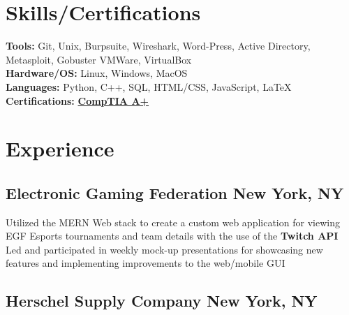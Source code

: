 \documentclass[a4paper]{Resume}
\begin{document}
\begin{onehalfspace}
\sectionsep

\section{Skills/Certifications} 
\hrulefill


\pt \textbf{Tools:} Git, Unix, Burpsuite, Wireshark, Word-Press, Active Directory, Metasploit, Gobuster VMWare, VirtualBox \\

\pt \textbf{Hardware/OS:}  Linux, Windows, MacOS  \\

\pt \textbf{Languages:}  Python, C++, SQL, HTML/CSS, JavaScript, \LaTeX \\

\pt \textbf{Certifications:} \href{https://www.udemy.com/certificate/UC-98f894dc-4e81-4be3-aeb9-21b391568400/}{\textbf{CompTIA A+}} \\
\sectionsep


\section{Experience} 
\hrulefill 

\subsection{Electronic Gaming Federation \hfill \normalfont New York, NY}

\pt Utilized the MERN Web stack to create a custom web application for viewing EGF Esports tournaments and team details with the use of the \textbf{Twitch API} \\

\pt Led and participated in weekly mock-up presentations for showcasing new features and implementing improvements to the web/mobile GUI  \\

\sectionsep

\subsection{Herschel Supply Company \hfill \normalfont New York, NY}


\end{onehalfspace}
\end{document}
